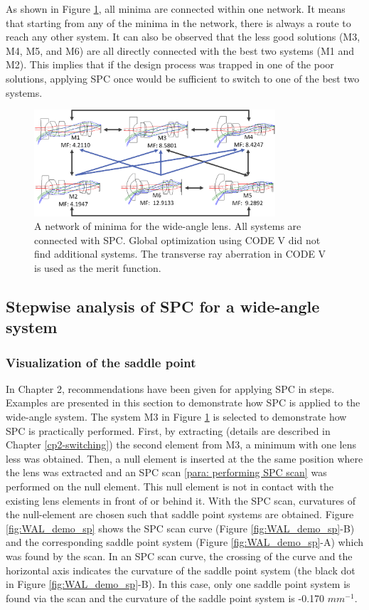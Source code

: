 As shown in Figure \ref{fig:WAL_network}, all minima are connected within one network. It means that starting from any of the minima in the network, there is always a route to reach any other system. It can also be observed that the less good solutions (M3, M4, M5, and M6) are all directly connected with the best two systems (M1 and M2). This implies that if the design process was trapped in one of the poor solutions, applying SPC once would be sufficient to switch to one of the best two systems.  

\begin{figure}[h!]
    \centering
    \includegraphics[width=0.8\textwidth]{chapter-4/figures/WAL_network.png}
    \caption{A network of minima for the wide-angle lens. All systems are connected with SPC. Global optimization using CODE V did not find additional systems. The transverse ray aberration in CODE V is used as the merit function.}
    \label{fig:WAL_network}
\end{figure}

\subsection{Stepwise analysis of SPC for a wide-angle system}
\subsubsection{Visualization of the saddle point }
In Chapter 2, recommendations have been given for applying SPC in steps. Examples are presented in this section to demonstrate how SPC is applied to the wide-angle system. The system M3 in Figure \ref{fig:WAL_network} is selected to demonstrate how SPC is practically performed. First, by extracting (details are described in Chapter \ref{cp2-switching}) the second element from M3, a minimum with one lens less was obtained. Then, a null element is inserted at the the same position where the lens was extracted and an SPC scan \ref{para: performing SPC scan} was performed on the null element. This null element is not in contact with the existing lens elements in front of or behind it.  With the SPC scan, curvatures of the null-element are chosen such that saddle point systems are obtained. Figure \ref{fig:WAL_demo_sp} shows the SPC scan curve (Figure \ref{fig:WAL_demo_sp}-B) and the corresponding saddle point system (Figure \ref{fig:WAL_demo_sp}-A) which was found by the scan. In an SPC scan curve, the crossing of the curve and the horizontal axis indicates the curvature of the saddle point system (the black dot in Figure \ref{fig:WAL_demo_sp}-B). In this case, only one saddle point system is found via the scan and the curvature of the saddle point system is -0.170 $mm^{-1}$. 

